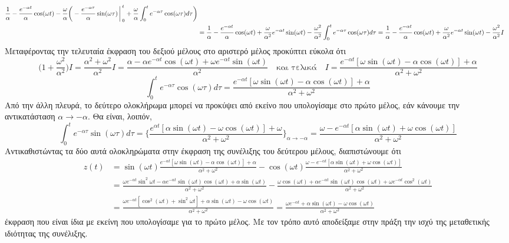 \documentclass[a4paper,twoside,10pt,openany]{memoir}
\theoremstyle{dotless}
\begin{document}
\begin{solution}
{\begin{align*}
\frac{1}{\alpha}-\frac{e^{-\alpha t}}{\alpha}\cos(\omega t)-\frac{\omega}{\alpha}
\bigg(-\frac{e^{-\alpha\tau}}{\alpha}\sin(\omega\tau)\bigg\arrowvert_{0}^{t}
+\frac{\omega}{\alpha}\int_{0}^{t}e^{-\alpha\tau}\cos(\omega\tau)d\tau\bigg)\\&=
\frac{1}{\alpha}-\frac{e^{-\alpha t}}{\alpha}\cos(\omega t)+\frac{\omega}{\alpha^2}
e^{-\alpha t}\sin(\omega t)-\frac{\omega^2}{\alpha^2}\int_{0}^{t}e^{-\alpha\tau}\cos(\omega\tau)d\tau=
\frac{1}{\alpha}-\frac{e^{-\alpha t}}{\alpha}\cos(\omega t)+\frac{\omega}{\alpha^2}
e^{-\alpha t}\sin(\omega t)-\frac{\omega^2}{\alpha^2}I
\end{align*}
Μεταφέροντας την τελευταία έκφραση του δεξιού μέλους στο αριστερό μέλος προκύπτει εύκολα ότι
\begin{equation*}
\bigg(1+\frac{\omega^2}{\alpha^2}\bigg)I=\frac{\alpha^2+\omega^2}{\alpha^2}I=
\frac{\alpha-\alpha e^{-\alpha t}\cos(\omega t)+\omega e^{-\alpha t}\sin(\omega t)}{\alpha^2}\quad\mbox{και τελικά}\quad
I=\frac{e^{-\alpha t}[\omega\sin(\omega t)-\alpha\cos(\omega t)]+\alpha}{\alpha^2+\omega^2}
\end{equation*}}
\begin{equation*}
\int_{0}^{t}e^{-\alpha\tau}\cos(\omega\tau)d\tau=\frac{e^{-\alpha t}[\omega\sin(\omega t)-\alpha\cos(\omega t)]+\alpha}{\alpha^2+\omega^2}
\end{equation*}
Από την άλλη πλευρά, το δεύτερο ολοκλήρωμα μπορεί να προκύψει από εκείνο που υπολογίσαμε στο πρώτο μέλος, εάν κάνουμε την αντικατάσταση $\alpha\rightarrow-\alpha$. Θα είναι, λοιπόν,
\begin{equation*}
\int_{0}^{t}e^{-\alpha\tau}\sin(\omega\tau)d\tau=\bigg\{\frac{e^{\alpha t}[\alpha\sin(\omega t)-
\omega\cos(\omega t)]+\omega}{\alpha^2+\omega^2}\bigg\}_{\alpha\rightarrow-\alpha}=\frac{\omega-e^{-\alpha t}
[\alpha\sin(\omega t)+\omega\cos(\omega t)]}{\alpha^2+\omega^2}
\end{equation*}
Αντικαθιστώντας τα δύο αυτά ολοκληρώματα στην έκφραση της συνέλιξης του δεύτερου μέλους, διαπιστώνουμε ότι
\begin{align*}
z(t)&=\sin(\omega t)\frac{e^{-\alpha t}[\omega\sin(\omega t)-\alpha\cos(\omega t)]+\alpha}{\alpha^2+\omega^2}-\cos(\omega t)\frac{\omega-e^{-\alpha t}[\alpha\sin(\omega t)+\omega\cos(\omega t)]}{\alpha^2+\omega^2}\\&=\frac{\omega e^{-\alpha t}\sin^2{\omega t}-\alpha e^{-\alpha t}\sin(\omega t)\cos(\omega t)+\alpha\sin(\omega t)}{\alpha^2+\omega^2}-\frac{\omega\cos(\omega t)+\alpha e^{-\alpha t}\sin(\omega t)\cos(\omega t)+\omega e^{-\alpha t}\cos^2(\omega t)}{\alpha^2+\omega^2}\\&=\frac{\omega e^{-\alpha t}[\cos^2(\omega t)+\sin^2{\omega t}]+
\alpha\sin(\omega t)-\omega\cos(\omega t)}{\alpha^2+\omega^2}=\frac{\omega e^{-\alpha t}+\alpha\sin(\omega t)-\omega\cos(\omega t)}{\alpha^2+\omega^2}
\end{align*}
έκφραση που είναι ίδια με εκείνη που υπολογίσαμε για το πρώτο μέλος. Με τον τρόπο αυτό αποδείξαμε στην πράξη την ισχύ της μεταθετικής ιδιότητας της συνέλιξης.
\end{solution}
\end{document}
